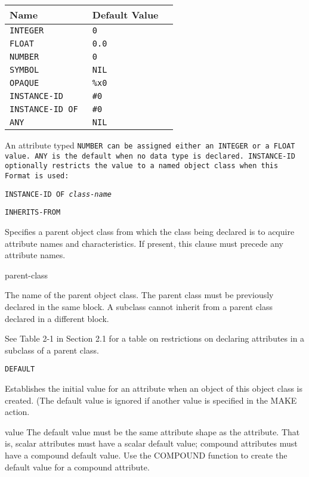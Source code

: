 {{\begin{arguments}
\begin{center}
\begin{tabular}{lll}
  \toprule
  Name & Default Value \\
  \midrule
  \tt{INTEGER} & \tt{0} \\
  \tt{FLOAT}  & \tt{0.0}\\
  \tt{NUMBER}  & \tt{0} \\
  \tt{SYMBOL}  & \tt{NIL} \\
  \tt{OPAQUE} & \verb|%x0| \\
  \tt{INSTANCE-ID} & \verb|#0| \\
  \tt{INSTANCE-ID OF} & \verb|#0| \\
  \tt{ANY}  & \tt{NIL} \\
  \bottomrule
\end{tabular}
\end{center}

An attribute typed \tt{NUMBER} can be assigned either an \tt{INTEGER}
or a \tt{FLOAT} value. \tt{ANY} is the default when no data type is
declared. \tt{INSTANCE-ID} optionally restricts the value to a
named object class when this Format is used:

\tt{INSTANCE-ID OF} \it{class-name}
\end{arguments}

\Clauses

\tt{INHERITS-FROM}

Specifies a parent object class from which the class being
declared is to acquire attribute names and characteristics.
If present, this clause must precede any attribute names.

parent-class

The name of the parent object class. The parent class must be
previously declared in the same block. A subclass cannot
inherit from a parent class declared in a different block.

See Table 2-1 in Section 2.1 for a table on restrictions on
declaring attributes in a subclass of a parent class.

\tt{DEFAULT}

Establishes the initial value for an attribute when an object
of this object class is created. (The default value is
ignored if another value is specified in the MAKE action.

value  The default value must be the same attribute shape as
the attribute. That is, scalar attributes must have a scalar
default value; compound attributes must have a compound
default value. Use the COMPOUND function to create the
default value for a compound attribute.

}}
